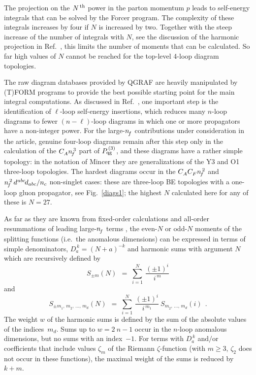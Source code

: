 \documentclass[12pt]{article}
\newcommand{\beq}{\begin{equation}}
\newcommand{\eeq}{\end{equation}}
\begin{document}
The projection on the $N^{\,\rm th}$ power in the parton momentum $p$ leads 
to self-energy integrals that can be solved by the {\sc Forcer} program. 
The complexity of these integrals increases by four if $N$ is increased by 
two. Together with the steep increase of the number of integrals with $N$, 
see the discussion of the harmonic projection in Ref.~\cite{MINCER2}, this
limits the number of moments that can be calculated. So far high
values of $N$ cannot be reached for the top-level 4-loop diagram topologies.

The raw diagram databases provided by QGRAF \cite{QGRAF} are heavily 
manipulated by (T)FORM \cite{FORM3,TFORM,FORM4} programs to provide the
best possible starting point for the main integral computations. As discussed
in Ref.~\cite{jvLL2016}, one important step is the identification of 
$\ell$-loop self-energy insertions, which reduces many $n$-loop diagrams to 
fewer $(n-\ell)$-loop diagrams in which one or more propagators have a 
non-integer power. For the large-${n^{}_{\! f}}$ contributions under consideration in 
the article, genuine four-loop diagrams remain after this step only in the
calculation of the ${C^{}_A} {n^{\,3}_{\! f}}$ part of $P_{\rm qg}^{\,(3)}$, and these
diagrams have a rather simple topology: in the notation of {\sc Mincer} they
are generalizations of the Y3 and O1 three-loop topologies. The hardest 
diagrams occur in the ${C^{}_A} {C^{}_F} {n^{\,2}_{\! f}}$ and ${n^{\,2}_{\! f}}\, {d^{\:\!abc\!}d_{abc}/n_c}$ non-singlet cases: 
these are three-loop BE topologies with a one-loop gluon propagator, see 
Fig.~\ref{diags1}; the highest $N$ calculated here for any of these is $N=27$. 
%

As far as they are known from fixed-order calculations \cite{mvvPns,mvvPsg}
and all-order resummations of leading large-${n^{}_{\! f}}$ terms
\cite{LargeNf1,LargeNf2,LargeNf3},
the even-$N$ or odd-$N$ moments of the splitting functions (i.e.~the
anomalous dimensions) can be expressed in terms of simple denominators, 
$D_a^{\,k} = (N+a)^{-k}$
and harmonic sums \cite{Hsums,BKurth} with argument $N$ which are recursively 
defined by
%
\beq
\label{Hsum1}
  S_{\pm m}(N) \:\:=\; \sum_{i=1}^{N}\: \frac{(\pm 1)^i}{i^{\, m}}
\eeq
%
and
%
\beq
\label{Hsum2}
  S_{\pm m_1^{},\,m_2^{},\,\ldots,\,m_d}(N) \:\:=\; \sum_{i=1}^{N}\:
  \frac{(\pm 1)^{i}}{i^{\, m_1^{}}}\: S_{m_2^{},\,\ldots,\,m_d}(i) 
\:\: .
\eeq
%
The weight $w$ of the harmonic sums is defined by the sum of the absolute 
values of the indices~$m_d$.  Sums up to $w = 2\:\!n-1$ occur in the 
$n$-loop anomalous dimensions, but no sums with an index~$-1$. 
For terms with $D_a^{\,k}$ and$/$or coefficients that include values 
$\zeta_m$ of the Riemann $\zeta$-function (with $m \geq 3$, $\zeta_2$ does 
not occur in these functions), the maximal weight of the sums is reduced by 
$k + m$.
\end{document}
